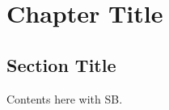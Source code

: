 \chapter{Chapter Title}\label{chap:one}
\section{Section Title}

Contents here \cite{Fukuda2008} with \ac{SB}.

